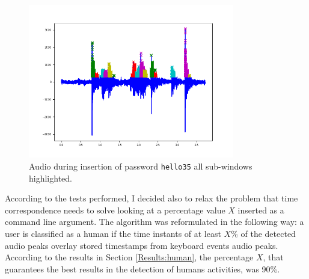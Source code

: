 \begin{figure}[h]
     \centering
	 \includegraphics[width=0.8\textwidth]{Images/AcCAPPCHA/hello35_time}
     \caption{\footnotesize{Audio during insertion of password \texttt{hello35} all sub-windows highlighted.}}\label{AcCAPPCHA:hello35_time}
\end{figure}
According to the tests performed, I decided also to relax the problem that time correspondence needs to solve looking at a percentage value $X$ inserted as a command line argument. The algorithm was reformulated in the following way: a user is classified as a human if the time instants of at least $X$\% of the detected audio peaks overlay stored timestamps from keyboard events audio peaks. According to the results in Section \ref{Results:human}, the percentage $X$, that guarantees the best results in the detection of humans activities, was 90\%.
